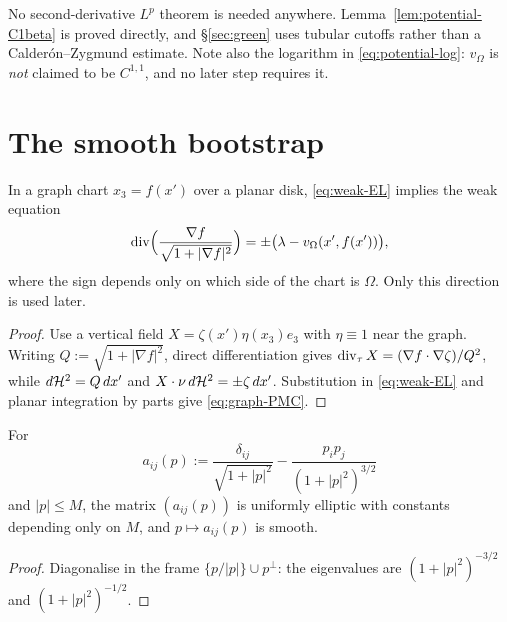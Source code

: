 \begin{fnote}\label{fnote:no-CZ}
No second-derivative $L^p$ theorem is needed anywhere.
Lemma~\ref{lem:potential-C1beta} is proved directly, and
\S\ref{sec:green} uses tubular cutoffs rather than a Calder\'on--Zygmund
estimate.  Note also the logarithm in \eqref{eq:potential-log}: $v_\Omega$ is
\emph{not} claimed to be $C^{1,1}$, and no later step requires it.
\end{fnote}

\section{The smooth bootstrap}\label{sec:bootstrap}

\begin{lemma}\label{lem:graph-PMC}
In a graph chart $x_3=f(x')$ over a planar disk, \eqref{eq:weak-EL} implies
the weak equation
\begin{equation}\label{eq:graph-PMC}
  \operatorname{div}\Bigl(\frac{\nabla f}{\sqrt{1+|\nabla f|^2}}\Bigr)
  =\pm\bigl(\lambda-v_\Omega(x',f(x'))\bigr),
\end{equation}
where the sign depends only on which side of the chart is $\Omega$.  Only
this direction is used later.
\end{lemma}

\begin{proof}
Use a vertical field $X=\zeta(x')\eta(x_3)e_3$ with $\eta\equiv1$ near the
graph.  Writing $Q:=\sqrt{1+|\nabla f|^2}$, direct differentiation gives
$\operatorname{div}_\tau X=(\nabla f\cdot\nabla\zeta)/Q^2$, while
$d\mathcal H^2=Q\,dx'$ and $X\cdot\nu\,d\mathcal H^2=\pm\zeta\,dx'$.  Substitution in
\eqref{eq:weak-EL} and planar integration by parts give
\eqref{eq:graph-PMC}.
\end{proof}

\begin{lemma}
\label{lem:mc-elliptic}
For
\[
  a_{ij}(p):=\frac{\delta_{ij}}{\sqrt{1+|p|^2}}-\frac{p_ip_j}{(1+|p|^2)^{3/2}}
\]
and $|p|\le M$, the matrix $(a_{ij}(p))$ is uniformly elliptic with constants
depending only on $M$, and $p\mapsto a_{ij}(p)$ is smooth.
\end{lemma}

\begin{proof}
Diagonalise in the frame $\{p/|p|\}\cup p^\perp$: the eigenvalues are
$(1+|p|^2)^{-3/2}$ and $(1+|p|^2)^{-1/2}$.
\end{proof}

